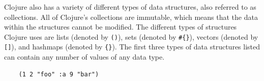 \documentclass[12pt]{article}
\newcommand{\comment}[1]{{\bf \tt  {#1}}}
\newcommand{\emcomment}[1]{\textcolor{ForestGreen}{\comment{Elena: {#1}}}}
\newcommand{\mmcomment}[1]{\textcolor{magenta}{\comment{Max: {#1}}}}
\begin{document}


Clojure also has a variety of different types of data structures, also referred to as 
collections. All 
of Clojure's collections are immutable, which means that the data within the structures 
cannot be modified. 
The different types of structures Clojure uses are lists (denoted by \texttt{()}), sets 
(denoted by
\texttt{\#\{\}}), vectors (denoted by \texttt{[]}), and hashmaps (denoted by 
\texttt{\{\}}). The first
three types of data structures listed can contain any number of values of any data type.
\begin{verbatim}
	(1 2 "foo" :a 9 "bar")
\end{verbatim}


\end{document}
